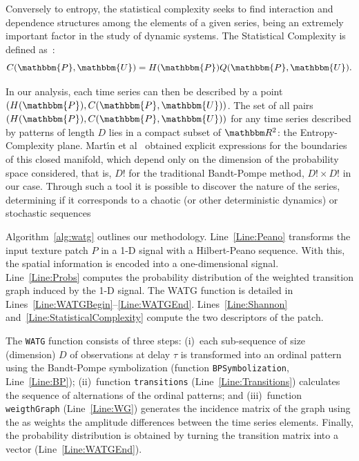 \documentclass[journal]{IEEEtran}
\begin{document}
Conversely to entropy, the statistical complexity seeks to find interaction and dependence structures among the elements of a given series, being an extremely important factor in the study of dynamic systems.
The Statistical Complexity is defined as~\cite{Lamberti2004Entropic}:
\begin{equation}
C(\mathbbm{P}, \mathbbm{U}) = H(\mathbbm{P}) Q(\mathbbm{P}, \mathbbm{U}).
\end{equation}

In our analysis, each time series can then be described by a point $(H(\mathbbm{P}), C(\mathbbm{P}, \mathbbm{U}))$.
The set of all pairs $(H(\mathbbm{P}), C(\mathbbm{P}, \mathbbm{U}))$ for any time series described by patterns of length $D$ lies in a compact subset of $\mathbbm R^2$: the Entropy-Complexity plane.
Mart\'{\i}n et al~\cite{martin2006generalized} obtained explicit expressions for the boundaries of this closed manifold, which depend only on the dimension of the probability space considered, that is, $D!$ for the traditional Bandt-Pompe method,
$D! \times D!$ in our case.
Through such a tool it is possible to discover the nature of the series, determining if it corresponds to a chaotic (or other deterministic dynamics) or stochastic sequences

Algorithm~\ref{alg:watg} outlines our methodology.
Line~\ref{Line:Peano} transforms the input texture patch $P$ in a \mbox{1-D} signal with a Hilbert-Peano sequence.
%
With this, the spatial information is encoded into a one-dimensional signal.
%
Line~\ref{Line:Probs} computes 
the probability distribution of the weighted transition graph induced by the \mbox{1-D} signal.
The WATG function is detailed in Lines~\ref{Line:WATGBegin}--\ref{Line:WATGEnd}.
%
Lines~\ref{Line:Shannon} and~\ref{Line:StatisticalComplexity} compute the two descriptors of the patch.

The \texttt{WATG} function consists of three steps: 
(i)~each sub-sequence of size (dimension) $D$ of observations at delay $\tau$ is transformed into an ordinal pattern using the Bandt-Pompe symbolization (function \texttt{BPSymbolization}, Line~\ref{Line:BP}); 
(ii)~function \texttt{transitions} (Line~\ref{Line:Transitions}) calculates the sequence of alternations of the ordinal patterns; and 
(iii)~function \texttt{weigthGraph} (Line~\ref{Line:WG}) generates the incidence matrix of the graph using the as weights the amplitude differences between the time series elements.
Finally, the probability distribution is obtained by turning the transition matrix into a vector (Line~\ref{Line:WATGEnd}).
\end{document}
